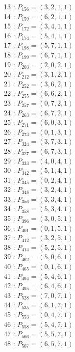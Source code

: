 \documentclass{article}
\begin{document}
{\begin{multicols}{2}
13 : $P_{156}=( 3, 2, 1, 1 )$\\
14 : $P_{159}=( 6, 2, 1, 1 )$\\
15 : $P_{172}=( 3, 4, 1, 1 )$\\
16 : $P_{174}=( 5, 4, 1, 1 )$\\
17 : $P_{198}=( 5, 7, 1, 1 )$\\
18 : $P_{199}=( 6, 7, 1, 1 )$\\
19 : $P_{203}=( 2, 0, 2, 1 )$\\
20 : $P_{212}=( 3, 1, 2, 1 )$\\
21 : $P_{252}=( 3, 6, 2, 1 )$\\
22 : $P_{255}=( 6, 6, 2, 1 )$\\
23 : $P_{257}=( 0, 7, 2, 1 )$\\
24 : $P_{263}=( 6, 7, 2, 1 )$\\
25 : $P_{271}=( 6, 0, 3, 1 )$\\
26 : $P_{273}=( 0, 1, 3, 1 )$\\
27 : $P_{324}=( 3, 7, 3, 1 )$\\
28 : $P_{327}=( 6, 7, 3, 1 )$\\
29 : $P_{333}=( 4, 0, 4, 1 )$\\
30 : $P_{342}=( 5, 1, 4, 1 )$\\
31 : $P_{345}=( 0, 2, 4, 1 )$\\
32 : $P_{348}=( 3, 2, 4, 1 )$\\
33 : $P_{356}=( 3, 3, 4, 1 )$\\
34 : $P_{358}=( 5, 3, 4, 1 )$\\
35 : $P_{396}=( 3, 0, 5, 1 )$\\
36 : $P_{401}=( 0, 1, 5, 1 )$\\
37 : $P_{412}=( 3, 2, 5, 1 )$\\
38 : $P_{414}=( 5, 2, 5, 1 )$\\
39 : $P_{462}=( 5, 0, 6, 1 )$\\
40 : $P_{465}=( 0, 1, 6, 1 )$\\
41 : $P_{494}=( 5, 4, 6, 1 )$\\
42 : $P_{495}=( 6, 4, 6, 1 )$\\
43 : $P_{528}=( 7, 0, 7, 1 )$\\
44 : $P_{535}=( 6, 1, 7, 1 )$\\
45 : $P_{553}=( 0, 4, 7, 1 )$\\
46 : $P_{558}=( 5, 4, 7, 1 )$\\
47 : $P_{566}=( 5, 5, 7, 1 )$\\
48 : $P_{567}=( 6, 5, 7, 1 )$\\
\end{multicols}
}
\end{document}
